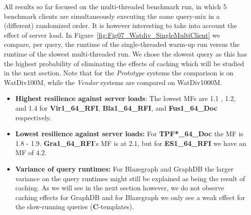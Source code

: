 
%
All results so far focused on the multi-threaded benchmark run, in which 5 benchmark clients are simultaneously executing the same query-mix in a (different) randomized order. It is however interesting to take into account the effect of server load. In Figure~\ref{fig:Fig07_Watdiv_SingleMultiClient} we compare, per query, the runtime of the single-threaded warm-up run versus the runtime of the slowest multi-threaded run. We chose the slowest query as this has the highest probability of eliminating the effects of caching which will be studied in the next section. Note that for the \emph{Prototype} systems the comparison is on WatDiv100M, while the \emph{Vendor} systems are compared on WatDiv1000M.


\begin{itemize}
	\item \textbf{Highest resilience against server loads}: The lowest MFs are 1.1 , 1.2, and 1.4 for \textbf{Vir1\_64\_RFI}, \textbf{Bla1\_64\_RFI}, and \textbf{Fus1\_64\_Doc} respectively. 
	 
	\item \textbf{Lowest resilience against server loads:} For \textbf{TPF*\_64\_Doc} the MF is 1.8 - 1.9.  \textbf{Gra1\_64\_RFI}'s MF is at 2.1, but for \textbf{ES1\_64\_RFI} we have an MF of 4.2.
	
	\item \textbf{Variance of query runtimes:} For Blazegraph and GraphDB the larger variance on the query runtimes might still be explained as being the result of caching. As we will see in the next section however, we do not observe caching effects for GraphDB and for Blazegraph we only see a weak effect for the slow-running queries (\textbf{C}-templates).
\end{itemize}

